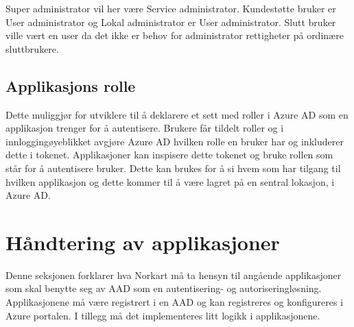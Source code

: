 Super administrator vil her være Service administrator. Kundestøtte bruker er User administrator og Lokal administrator er User administrator. Slutt bruker ville vært en user da det ikke er behov for administrator rettigheter på ordinære sluttbrukere.

\subsection*{Applikasjons rolle}
Dette muliggjør for utviklere til å deklarere et sett med roller i Azure AD som en applikasjon trenger for å autentisere. Brukere får tildelt roller og i innloggingøyeblikket avgjøre Azure AD hvilken rolle en bruker har og inkluderer dette i tokenet. Applikasjoner kan inspisere dette tokenet og bruke rollen som står for å autentisere bruker. Dette kan brukes for å si hvem som har tilgang til hvilken applikasjon og dette kommer til å være lagret på en sentral lokasjon, i Azure AD. \cite{AppRoleOgClaims}

\section{Håndtering av applikasjoner}
\label{sec:konfigurasjon_handteringAvApplikasjoner}
Denne seksjonen forklarer hva Norkart må ta hensyn til angående applikasjoner som skal benytte seg av AAD som en autentisering- og  autoriseringløsning. Applikasjonene må være registrert i en AAD og kan registreres og konfigureres i Azure portalen. I tillegg må det implementeres litt logikk i applikasjonene.

